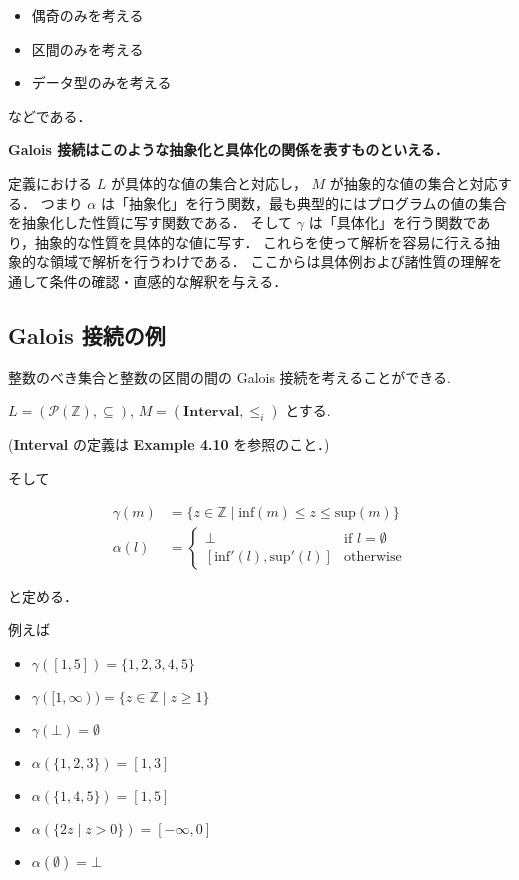 \documentclass[uplatex]{jsarticle}
\begin{document}
\begin{itemize}
  \item 偶奇のみを考える
  \item 区間のみを考える
  \item データ型のみを考える
\end{itemize}

などである．

\textbf{Galois 接続はこのような抽象化と具体化の関係を表すものといえる．}

定義における $L$ が具体的な値の集合と対応し， $M$ が抽象的な値の集合と対応する．
つまり $\alpha$ は「抽象化」を行う関数，最も典型的にはプログラムの値の集合を抽象化した性質に写す関数である．
そして $\gamma$ は「具体化」を行う関数であり，抽象的な性質を具体的な値に写す．
これらを使って解析を容易に行える抽象的な領域で解析を行うわけである．
ここからは具体例および諸性質の理解を通して条件の確認・直感的な解釈を与える．


\subsection{Galois 接続の例}
\label{ex:galois-connection-example}

整数のべき集合と整数の区間の間の Galois 接続を考えることができる.

$L = (\mathcal{P}(\mathbb{Z}), \subseteq)$,
$M = (\textbf{Interval}, \leq_i)$ とする.

(\textbf{Interval} の定義は \textbf{Example 4.10} を参照のこと．)

そして

\begin{align*}
  \gamma(m) & = \{ z \in \mathbb{Z} \mid \mathrm{inf}(m) \leq z \leq \mathrm{sup}(m) \} \\
  \alpha(l) & = \begin{cases}
                  \bot \quad                           & \text{if } l = \emptyset \\
                  [\mathrm{inf'}(l), \mathrm{sup'}(l)] & \text{otherwise}
                \end{cases}
\end{align*}

と定める．

例えば

\begin{itemize}
  \item $\gamma([1, 5]) = \{ 1, 2, 3, 4, 5 \}$
  \item $\gamma([1, \infty)) = \{ z \in \mathbb{Z} \mid z \geq 1 \}$
  \item $\gamma(\bot) = \emptyset$
  \item $\alpha(\{ 1, 2, 3 \}) = [1, 3]$
  \item $\alpha(\{1, 4, 5\}) = [1, 5]$
  \item $\alpha(\{2z \mid z > 0\}) = [-\infty, 0]$
  \item $\alpha(\emptyset) = \bot$
\end{itemize}
\end{document}
